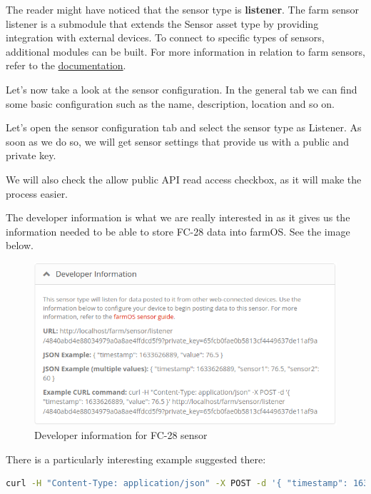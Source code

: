 The reader might have noticed that the sensor type is \textbf{listener}. The farm sensor listener is a submodule that extends the Sensor asset type by providing integration with external devices. To connect to specific types of sensors, additional modules can be built. For more information in relation to farm sensors, refer to the \href{https://farmos.org/guide/assets/sensors/}{documentation}.

Let's now take a look at the sensor configuration. In the general tab we can find some basic configuration such as the name, description, location and so on.

Let's open the sensor configuration tab and select the sensor type as Listener. As soon as we do so, we will get sensor settings that provide us with a public and private key.

We will also check the allow public API read access checkbox, as it will make the process easier.

The developer information is what we are really interested in as it gives us the information needed to be able to store FC-28 data into farmOS. See the image below.

\begin{figure}[H]
    \centering
    \includegraphics[width=1\textwidth]{fig/drupal-install/developer-info.png}
    \caption{Developer information for FC-28 sensor}
    \label{fig:developer-info}
\end{figure}

There is a particularly interesting example suggested there:
\begin{lstlisting}[language=bash]
    curl -H "Content-Type: application/json" -X POST -d '{ "timestamp": 1633626889, "value": 76.5 }' http://localhost/farm/sensor/listener/4840abd4e88034979a0a8ae4ffdcd5f9?private_key=65fcb0fae0b5813cf4449637de11af9a
\end{lstlisting}

